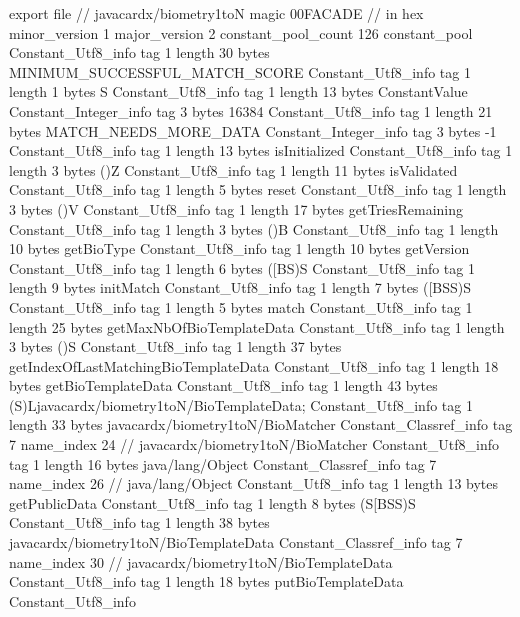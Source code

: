 export file {		// javacardx/biometry1toN
	magic	00FACADE		 // in hex
	minor_version	1
	major_version	2
	constant_pool_count	126
	constant_pool {
		Constant_Utf8_info {
			tag	1
			length	30
			bytes	MINIMUM_SUCCESSFUL_MATCH_SCORE
		}
		Constant_Utf8_info {
			tag	1
			length	1
			bytes	S
		}
		Constant_Utf8_info {
			tag	1
			length	13
			bytes	ConstantValue
		}
		Constant_Integer_info {
			tag	3
			bytes	16384
		}
		Constant_Utf8_info {
			tag	1
			length	21
			bytes	MATCH_NEEDS_MORE_DATA
		}
		Constant_Integer_info {
			tag	3
			bytes	-1
		}
		Constant_Utf8_info {
			tag	1
			length	13
			bytes	isInitialized
		}
		Constant_Utf8_info {
			tag	1
			length	3
			bytes	()Z
		}
		Constant_Utf8_info {
			tag	1
			length	11
			bytes	isValidated
		}
		Constant_Utf8_info {
			tag	1
			length	5
			bytes	reset
		}
		Constant_Utf8_info {
			tag	1
			length	3
			bytes	()V
		}
		Constant_Utf8_info {
			tag	1
			length	17
			bytes	getTriesRemaining
		}
		Constant_Utf8_info {
			tag	1
			length	3
			bytes	()B
		}
		Constant_Utf8_info {
			tag	1
			length	10
			bytes	getBioType
		}
		Constant_Utf8_info {
			tag	1
			length	10
			bytes	getVersion
		}
		Constant_Utf8_info {
			tag	1
			length	6
			bytes	([BS)S
		}
		Constant_Utf8_info {
			tag	1
			length	9
			bytes	initMatch
		}
		Constant_Utf8_info {
			tag	1
			length	7
			bytes	([BSS)S
		}
		Constant_Utf8_info {
			tag	1
			length	5
			bytes	match
		}
		Constant_Utf8_info {
			tag	1
			length	25
			bytes	getMaxNbOfBioTemplateData
		}
		Constant_Utf8_info {
			tag	1
			length	3
			bytes	()S
		}
		Constant_Utf8_info {
			tag	1
			length	37
			bytes	getIndexOfLastMatchingBioTemplateData
		}
		Constant_Utf8_info {
			tag	1
			length	18
			bytes	getBioTemplateData
		}
		Constant_Utf8_info {
			tag	1
			length	43
			bytes	(S)Ljavacardx/biometry1toN/BioTemplateData;
		}
		Constant_Utf8_info {
			tag	1
			length	33
			bytes	javacardx/biometry1toN/BioMatcher
		}
		Constant_Classref_info {
			tag	7
			name_index	24		// javacardx/biometry1toN/BioMatcher
		}
		Constant_Utf8_info {
			tag	1
			length	16
			bytes	java/lang/Object
		}
		Constant_Classref_info {
			tag	7
			name_index	26		// java/lang/Object
		}
		Constant_Utf8_info {
			tag	1
			length	13
			bytes	getPublicData
		}
		Constant_Utf8_info {
			tag	1
			length	8
			bytes	(S[BSS)S
		}
		Constant_Utf8_info {
			tag	1
			length	38
			bytes	javacardx/biometry1toN/BioTemplateData
		}
		Constant_Classref_info {
			tag	7
			name_index	30		// javacardx/biometry1toN/BioTemplateData
		}
		Constant_Utf8_info {
			tag	1
			length	18
			bytes	putBioTemplateData
		}
		Constant_Utf8_info {
}}}

